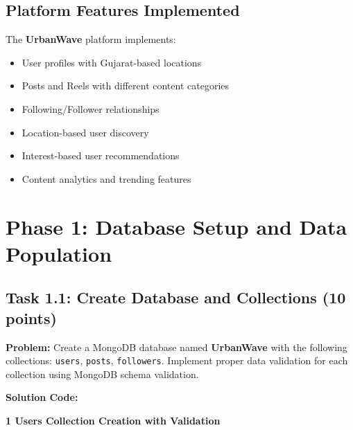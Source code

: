 \documentclass[12pt,a4paper]{article}
\begin{document}
\subsection{Platform Features Implemented}
The \textbf{UrbanWave} platform implements:
\begin{itemize}
    \item User profiles with Gujarat-based locations
    \item Posts and Reels with different content categories
    \item Following/Follower relationships
    \item Location-based user discovery
    \item Interest-based user recommendations
    \item Content analytics and trending features
\end{itemize}

\section{Phase 1: Database Setup and Data Population}
\subsection{Task 1.1: Create Database and Collections (10 points)}
\textbf{Problem:} Create a MongoDB database named \textbf{UrbanWave} with the following collections: \texttt{users}, \texttt{posts}, \texttt{followers}. Implement proper data validation for each collection using MongoDB schema validation.  

\textbf{Solution Code:}

\begin{center}
\textbf{1 Users Collection Creation with Validation}
\end{center}
\end{document}

